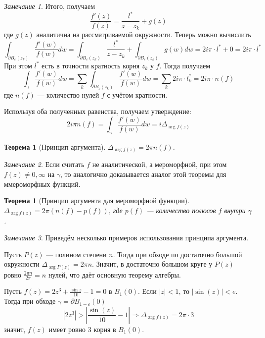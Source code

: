 \documentclass[12pt]{article}
\newcommand{\Ra}{\Rightarrow}
\newcounter{cnt}
\theoremstyle{thmnote}
\newtheorem{theorem}[cnt]{Теорема}
\theoremstyle{remark}
\newtheorem*{remark}{Замечание}
\theoremstyle{defnote}
\begin{document}
\begin{remark}
    Итого, получаем
    \begin{equation*}
        \frac{f'(z)}{f(z)} = \frac{l^*}{z - z_k} + g(z)
    \end{equation*}
    где $g(z)$ аналитична на рассматриваемой окружности. Теперь можно вычислить
    \begin{equation*}
        \int_{\partial B_\varepsilon(z_k)} \frac{f'(w)}{f(w)} dw = \int_{\partial B_\varepsilon(z_k)} \frac{l^*}{z - z_k} + \int_{\partial B_\varepsilon(z_k)} g(w) dw = 2 i \pi \cdot l^* + 0 = 2 i \pi \cdot l^*
    \end{equation*}
    При этом $l^*$ есть в точности кратность корня $z_k$ у $f$. Тогда получаем
    \begin{equation*}
        \int_\gamma \frac{f'(w)}{f(w)} dw = \sum_k \int_{\partial B_\varepsilon(z_k)} \frac{f'(w)}{f(w)} dw = \sum_k 2 i \pi \cdot l_k^* = 2 i \pi \cdot n(f)
    \end{equation*}
    где $n(f)$ --- количество нулей $f$ с учётом кратности.

    Используя оба полученных равенства, получаем утверждение:
    \begin{equation*}
        2 i \pi n(f) = \int_\gamma \frac{f'(w)}{f(w)} dw = i \Delta_{\arg f(z)}
    \end{equation*}
\end{remark}

\begin{theorem}[Принцип аргумента]
\label{prarg}
    $\Delta_{\arg f(z)} = 2 \pi n(f)$.
\end{theorem}

\begin{remark}
    Если считать $f$ не аналитической, а мероморфной, при этом $f(z) \neq 0, \infty$ на $\gamma$, то аналогично доказывается аналог этой теоремы для ммероморфных функций.
\end{remark}

\begin{theorem}[Принцип аргумента для мероморфной функции]
    $\Delta_{\arg f(z)} = 2 \pi (n(f) - p(f))$, где $p(f)$ --- количество полюсов $f$ внутри $\gamma$.
\end{theorem}

\begin{remark}
    Приведём несколько примеров использования принципа аргумента.

    Пусть $P(z)$ --- полином степени $n$. Тогда при обходе по достаточно большой окружности $\Delta_{\arg P(z)} = 2 \pi n$. Значит, в достаточно большом круге у $P(z)$ ровно $\frac{2 \pi n}{2 \pi} = n$ нулей, что даёт основную теорему алгебры.

    Пусть $f(z) = 2 z^3 + \frac{\sin z}{10} - 1 = 0$ в $B_1(0)$. Если $|z| < 1$, то $|\sin(z)| < e$. Тогда при обходе $\gamma = \partial B_{1 - \varepsilon}(0)$
    \begin{equation*}
        |2 z^3| > \left| \frac{\sin(z)}{10} - 1 \right| \Ra \Delta_{\arg f(z)} = 2 \pi \cdot 3
    \end{equation*}
    значит, $f(z)$ имеет ровно 3 корня в $B_1(0)$.
\end{remark}
\end{document}
